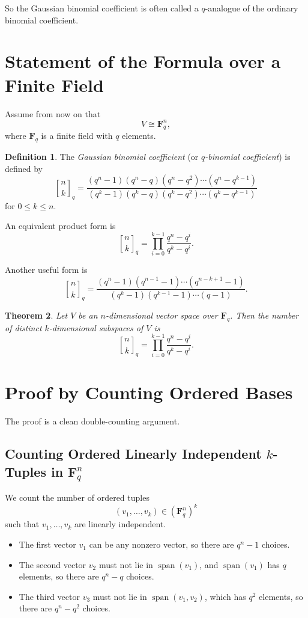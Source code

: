 \documentclass[11pt]{article}
\newtheorem{theorem}{Theorem}[section]
\theoremstyle{definition}
\newtheorem{definition}[theorem]{Definition}
\theoremstyle{remark}
\newcommand{\F}{\mathbf{F}}
\newcommand{\Span}{\operatorname{span}}
\newcommand{\qbinom}[2]{\genfrac{[}{]}{0pt}{}{#1}{#2}_q}
\begin{document}
	So the Gaussian binomial coefficient is often called a \(q\)-analogue of the ordinary binomial coefficient.
	
	\section{Statement of the Formula over a Finite Field}
	
	Assume from now on that
	\[
	V \cong \F_q^n,
	\]
	where \(\F_q\) is a finite field with \(q\) elements.
	
	\begin{definition}
		The \emph{Gaussian binomial coefficient} (or \emph{\(q\)-binomial coefficient}) is defined by
		\[
		\qbinom{n}{k}
		=
		\frac{(q^n-1)(q^n-q)(q^n-q^2)\cdots(q^n-q^{k-1})}
		{(q^k-1)(q^k-q)(q^k-q^2)\cdots(q^k-q^{k-1})}
		\]
		for \(0\leq k\leq n\).
	\end{definition}
	
	An equivalent product form is
	\[
	\qbinom{n}{k}
	=
	\prod_{i=0}^{k-1}\frac{q^n-q^i}{q^k-q^i}.
	\]
	
	Another useful form is
	\[
	\qbinom{n}{k}
	=
	\frac{(q^n-1)(q^{n-1}-1)\cdots(q^{n-k+1}-1)}
	{(q^k-1)(q^{k-1}-1)\cdots(q-1)}.
	\]
	
	\begin{theorem}
		Let \(V\) be an \(n\)-dimensional vector space over \(\F_q\). Then the number of distinct \(k\)-dimensional subspaces of \(V\) is
		\[
		\boxed{
			\qbinom{n}{k}
			=
			\prod_{i=0}^{k-1}\frac{q^n-q^i}{q^k-q^i}
		}.
		\]
	\end{theorem}
	
	\section{Proof by Counting Ordered Bases}
	
	The proof is a clean double-counting argument.
	
	\subsection{Counting Ordered Linearly Independent \(k\)-Tuples in \(\F_q^n\)}
	
	We count the number of ordered tuples
	\[
	(v_1,\dots,v_k)\in (\F_q^n)^k
	\]
	such that \(v_1,\dots,v_k\) are linearly independent.
	
	\begin{itemize}
		\item The first vector \(v_1\) can be any nonzero vector, so there are \(q^n-1\) choices.
		\item The second vector \(v_2\) must not lie in \(\Span(v_1)\), and \(\Span(v_1)\) has \(q\) elements, so there are \(q^n-q\) choices.
		\item The third vector \(v_3\) must not lie in \(\Span(v_1,v_2)\), which has \(q^2\) elements, so there are \(q^n-q^2\) choices.
	\end{itemize}
	
\end{document}
